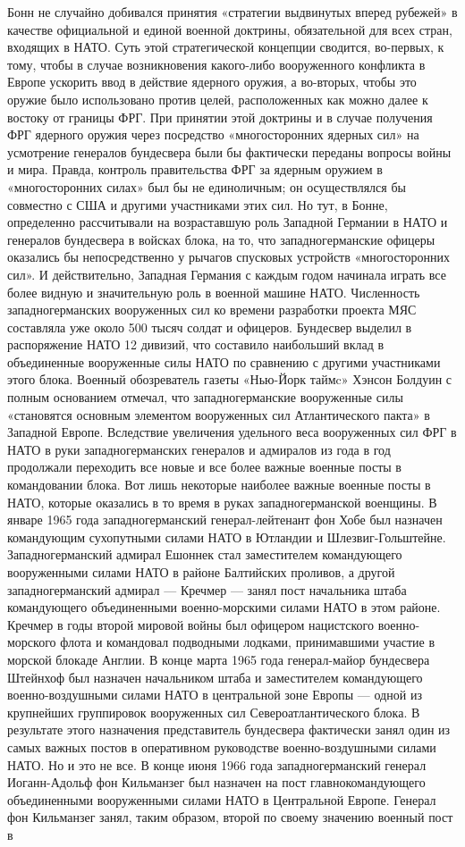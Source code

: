 \documentclass[12pt, a4paper, openany]{book}
\begin{document}
	Бонн не случайно добивался принятия «стратегии выдвинутых вперед рубежей» в качестве официальной и единой военной доктрины, обязательной для всех стран, входящих в НАТО. Суть этой стратегической концепции сводится, во-первых, к тому, чтобы в случае возникновения какого-либо вооруженного конфликта в Европе ускорить ввод в действие ядерного оружия, а во-вторых, чтобы это оружие было использовано против целей, расположенных как можно далее к востоку от границы ФРГ. При принятии этой доктрины и в случае получения ФРГ ядерного оружия через посредство «многосторонних ядерных сил» на усмотрение генералов бундесвера были бы фактически переданы вопросы войны и мира. Правда, контроль правительства ФРГ за ядерным оружием в «многосторонних силах» был бы не единоличным; он осуществлялся бы совместно с США и другими участниками этих сил. Но тут, в Бонне, определенно рассчитывали на возраставшую роль Западной Германии в НАТО и генералов бундесвера в войсках блока, на то, что западногерманские офицеры оказались бы непосредственно у рычагов спусковых устройств «многосторонних сил». И действительно, Западная Германия с каждым годом начинала играть все более видную и значительную роль в военной машине НАТО. Численность западногерманских вооруженных сил ко времени разработки проекта МЯС составляла уже около 500 тысяч солдат и офицеров. Бундесвер выделил в распоряжение НАТО 12 дивизий, что составило наибольший вклад в объединенные вооруженные силы НАТО по сравнению с другими участниками этого блока. Военный обозреватель газеты «Нью-Йорк таймc» Хэнсон Болдуин с полным основанием отмечал, что западногерманские вооруженные силы «становятся основным элементом вооруженных сил Атлантического пакта» в Западной Европе. Вследствие увеличения удельного веса вооруженных сил ФРГ в НАТО в руки западногерманских генералов и адмиралов из года в год продолжали переходить все новые и все более важные военные посты в командовании блока. Вот лишь некоторые наиболее важные военные посты в НАТО, которые оказались в то время в руках западногерманской военщины. В январе 1965 года западногерманский генерал-лейтенант фон Хобе был назначен командующим сухопутными силами НАТО в Ютландии и Шлезвиг-Гольштейне. Западногерманский адмирал Ешоннек стал заместителем командующего вооруженными силами НАТО в районе Балтийских проливов, а другой западногерманский адмирал — Кречмер — занял пост начальника штаба командующего объединенными военно-морскими силами НАТО в этом районе. Кречмер в годы второй мировой войны был офицером нацистского военно-морского флота и командовал подводными лодками, принимавшими участие в морской блокаде Англии. В конце марта 1965 года генерал-майор бундесвера Штейнхоф был назначен начальником штаба и заместителем командующего военно-воздушными силами НАТО в центральной зоне Европы — одной из крупнейших группировок вооруженных сил Североатлантического блока. В результате этого назначения представитель бундесвера фактически занял один из самых важных постов в оперативном руководстве военно-воздушными силами НАТО. Но и это не все. В конце июня 1966 года западногерманский генерал Иоганн-Адольф фон Кильманзег был назначен на пост главнокомандующего объединенными вооруженными силами НАТО в Центральной Европе. Генерал фон Кильманзег занял, таким образом, второй по своему значению военный пост в 
\end{document}
